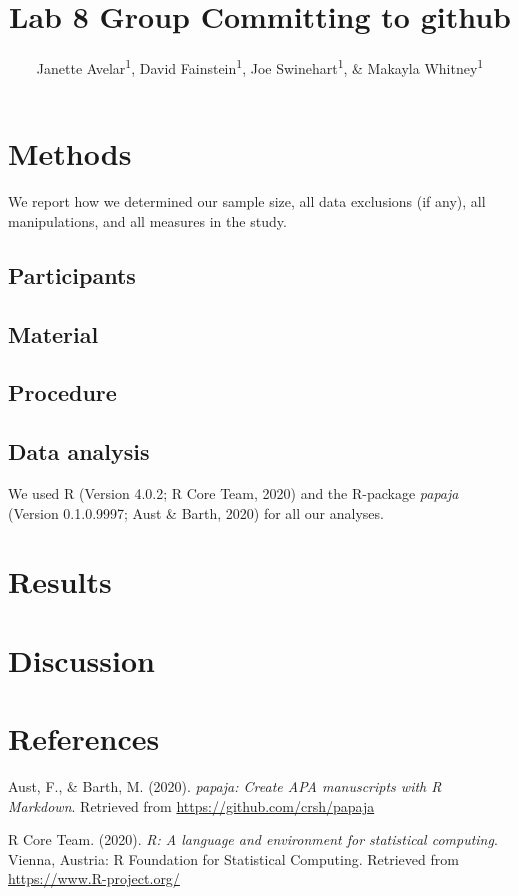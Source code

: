 \documentclass[
  english,
  man]{apa6}
\title{Lab 8 Group Committing to github}
\author{Janette Avelar\textsuperscript{1}, David Fainstein\textsuperscript{1}, Joe Swinehart\textsuperscript{1}, \& Makayla Whitney\textsuperscript{1}}
\date{}
\affiliation{\vspace{0.5cm}\textsuperscript{1} University of Oregon}
\begin{document}
\maketitle

\hypertarget{methods}{%
\section{Methods}\label{methods}}

We report how we determined our sample size, all data exclusions (if any), all manipulations, and all measures in the study.

\hypertarget{participants}{%
\subsection{Participants}\label{participants}}

\hypertarget{material}{%
\subsection{Material}\label{material}}

\hypertarget{procedure}{%
\subsection{Procedure}\label{procedure}}

\hypertarget{data-analysis}{%
\subsection{Data analysis}\label{data-analysis}}

We used R (Version 4.0.2; R Core Team, 2020) and the R-package \emph{papaja} (Version 0.1.0.9997; Aust \& Barth, 2020) for all our analyses.

\hypertarget{results}{%
\section{Results}\label{results}}

\hypertarget{discussion}{%
\section{Discussion}\label{discussion}}

\newpage

\hypertarget{references}{%
\section{References}\label{references}}

\begingroup
\setlength{\parindent}{-0.5in}
\setlength{\leftskip}{0.5in}

\hypertarget{refs}{}
\leavevmode\hypertarget{ref-R-papaja}{}%
Aust, F., \& Barth, M. (2020). \emph{papaja: Create APA manuscripts with R Markdown}. Retrieved from \url{https://github.com/crsh/papaja}

\leavevmode\hypertarget{ref-R-base}{}%
R Core Team. (2020). \emph{R: A language and environment for statistical computing}. Vienna, Austria: R Foundation for Statistical Computing. Retrieved from \url{https://www.R-project.org/}

\endgroup
\end{document}
